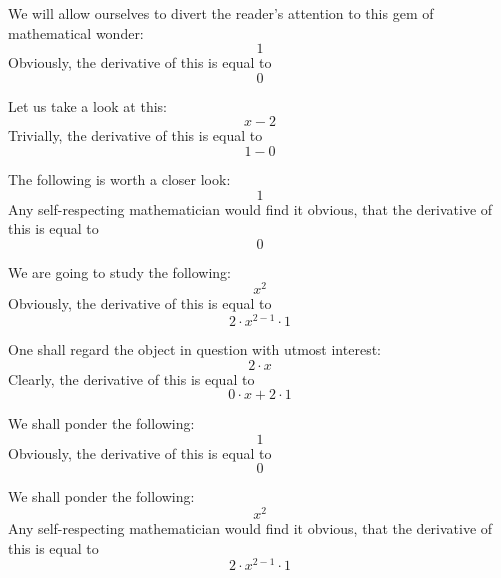 \documentclass{article}
\begin{document}
We will allow ourselves to divert the reader's attention to this gem of mathematical wonder:
\begin{equation}
1 
\end{equation}
Obviously, the derivative of this is equal to
\begin{equation}
0 
\end{equation}

Let us take a look at this:
\begin{equation}
x - 2 
\end{equation}
Trivially, the derivative of this is equal to
\begin{equation}
1 - 0 
\end{equation}

The following is worth a closer look:
\begin{equation}
1 
\end{equation}
Any self-respecting mathematician would find it obvious, that the derivative of this is equal to
\begin{equation}
0 
\end{equation}

We are going to study the following:
\begin{equation}
x ^{2 } 
\end{equation}
Obviously, the derivative of this is equal to
\begin{equation}
2 \cdot x ^{2 - 1 } \cdot 1 
\end{equation}

One shall regard the object in question with utmost interest:
\begin{equation}
2 \cdot x 
\end{equation}
Clearly, the derivative of this is equal to
\begin{equation}
0 \cdot x + 2 \cdot 1 
\end{equation}

We shall ponder the following:
\begin{equation}
1 
\end{equation}
Obviously, the derivative of this is equal to
\begin{equation}
0 
\end{equation}

We shall ponder the following:
\begin{equation}
x ^{2 } 
\end{equation}
Any self-respecting mathematician would find it obvious, that the derivative of this is equal to
\begin{equation}
2 \cdot x ^{2 - 1 } \cdot 1 
\end{equation}
\end{document}

